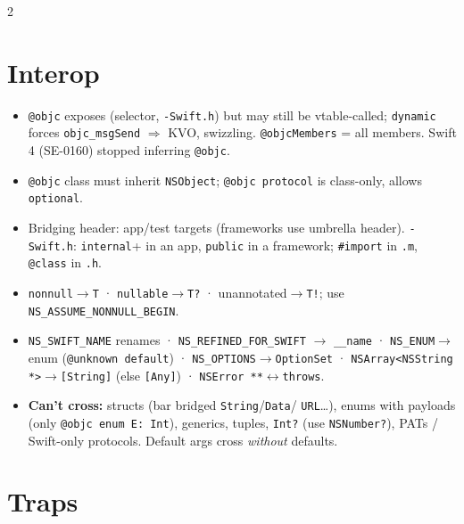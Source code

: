 \documentclass[8pt]{extarticle}
\begin{document}
\begin{multicols}{2}
\section{Interop}
\begin{itemize}
  \item \texttt{@objc} exposes (selector, \texttt{-Swift.h}) but may still be
        vtable-called; \texttt{dynamic} forces \texttt{objc\_msgSend}
        $\Rightarrow$ KVO, swizzling. \texttt{@objcMembers} = all members.
        Swift 4 (SE-0160) stopped inferring \texttt{@objc}.
  \item \texttt{@objc} class must inherit \texttt{NSObject};
        \texttt{@objc protocol} is class-only, allows \texttt{optional}.
  \item Bridging header: app/test targets (frameworks use umbrella header).
        \texttt{-Swift.h}: \texttt{internal}+ in an app, \texttt{public} in a
        framework; \texttt{\#import} in \texttt{.m}, \texttt{@class} in \texttt{.h}.
  \item \texttt{nonnull}$\to$\texttt{T} · \texttt{nullable}$\to$\texttt{T?} ·
        unannotated$\to$\texttt{T!}; use \texttt{NS\_ASSUME\_NONNULL\_BEGIN}.
  \item \texttt{NS\_SWIFT\_NAME} renames · \texttt{NS\_REFINED\_FOR\_SWIFT}
        $\to$ \texttt{\_\_name} · \texttt{NS\_ENUM}$\to$enum (\texttt{@unknown
        default}) · \texttt{NS\_OPTIONS}$\to$\texttt{OptionSet} ·
        \texttt{NSArray<NSString *>}$\to$\texttt{[String]} (else \texttt{[Any]}) ·
        \texttt{NSError **}$\leftrightarrow$\texttt{throws}.
  \item \textbf{Can't cross:} structs (bar bridged \texttt{String}/\texttt{Data}/%
        \texttt{URL}…), enums with payloads (only \texttt{@objc enum E: Int}),
        generics, tuples, \texttt{Int?} (use \texttt{NSNumber?}), PATs /
        Swift-only protocols. Default args cross \emph{without} defaults.
\end{itemize}

\section{Traps}
\begin{itemize}
\end{itemize}


\end{multicols}
\end{document}

